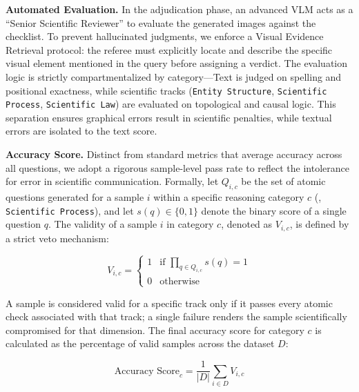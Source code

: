 \documentclass[runningheads]{llncs}
\begin{document}
\textbf{Automated Evaluation.} In the adjudication phase, an advanced VLM acts as a ``Senior Scientific Reviewer'' to evaluate the generated images against the checklist. To prevent hallucinated judgments, we enforce a Visual Evidence Retrieval protocol: the referee must explicitly locate and describe the specific visual element mentioned in the query before assigning a verdict. The evaluation logic is strictly compartmentalized by category—Text is judged on spelling and positional exactness, while scientific tracks (\texttt{Entity Structure}, \texttt{Scientific Process}, \texttt{Scientific Law}) are evaluated on topological and causal logic. This separation ensures graphical errors result in scientific penalties, while textual errors are isolated to the text score.

\textbf{Accuracy Score.} Distinct from standard metrics that average accuracy across all questions, we adopt a rigorous sample-level pass rate to reflect the intolerance for error in scientific communication. Formally, let $Q_{i,c}$ be the set of atomic questions generated for a sample $i$ within a specific reasoning category $c$ (\eg, \texttt{Scientific Process}), and let $s(q) \in \{0,1\}$ denote the binary score of a single question $q$. The validity of a sample $i$ in category $c$, denoted as $V_{i,c}$, is defined by a strict veto mechanism:

\begin{equation}
V_{i,c} = \begin{cases} 
1 & \text{if } \prod_{q \in Q_{i,c}} s(q) = 1 \\
0 & \text{otherwise}
\end{cases}
\end{equation}

A sample is considered valid for a specific track only if it passes every atomic check associated with that track; a single failure renders the sample scientifically compromised for that dimension. The final accuracy score for category $c$ is calculated as the percentage of valid samples across the dataset $D$:

\begin{equation}
\text{Accuracy Score}_{c} = \frac{1}{|D|} \sum_{i \in D} V_{i,c}
\end{equation}
\end{document}
